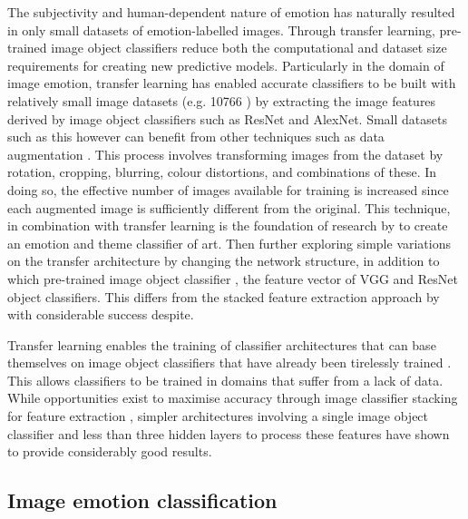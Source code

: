\documentclass{article}
\begin{document}
The subjectivity and human-dependent nature of emotion has naturally resulted in only small datasets of emotion-labelled images.
Through transfer learning, pre-trained image object classifiers reduce both the computational and dataset size requirements \citep{pan2009survey} for creating new predictive models.
Particularly in the domain of image emotion, transfer learning has enabled accurate classifiers to be built with relatively small image datasets (e.g. 10766 \citep{kim2018building}) by extracting the image features derived by image object classifiers such as ResNet and AlexNet.
Small datasets such as this however can benefit from other techniques such as data augmentation \citep{perez2017effectiveness}.
This process involves transforming images from the dataset by rotation, cropping, blurring, colour distortions, and combinations of these.
In doing so, the effective number of images available for training is increased since each augmented image is sufficiently different from the original.
This technique, in combination with transfer learning is the foundation of research by \citet{wangarttalk} to create an emotion and theme classifier of art.
Then further exploring simple variations on the transfer architecture by changing the network structure, in addition to which pre-trained image object classifier , the feature vector of VGG and ResNet object classifiers.
This differs from the stacked feature extraction approach by \citet{kim2018building} with considerable success despite.

Transfer learning enables the training of classifier architectures that can base themselves on image object classifiers that have already been tirelessly trained \citep{krizhevsky2012imagenet,pan2009survey}.
This allows classifiers to be trained in domains that suffer from a lack of data.
While opportunities exist to maximise accuracy through image classifier stacking for feature extraction \citep{kim2018building}, simpler architectures involving a single image object classifier and less than three hidden layers to process these features \citep{wangarttalk} have shown to provide considerably good results.


\subsection{Image emotion classification}
\end{document}
